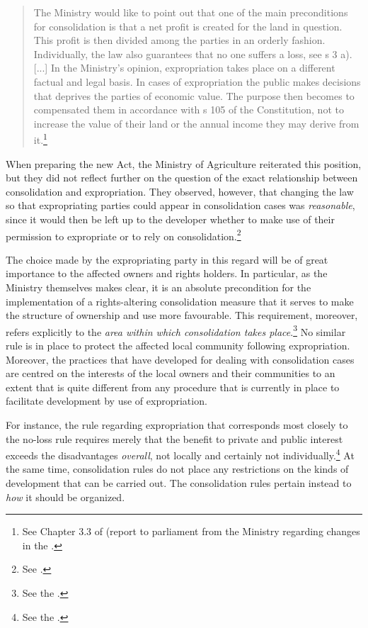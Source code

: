 \begin{quote}
The Ministry would like to point out that one of the main preconditions for consolidation is that a net profit is created for the land in question. This profit is then divided among the parties in an orderly fashion. Individually, the law also guarantees that no one suffers a loss, see s 3 a). [...] In the Ministry's opinion, expropriation takes place on a different factual and legal basis. In cases of expropriation the public makes decisions that deprives the parties of economic value. The purpose then becomes to compensated them in accordance with s 105 of the Constitution, not to increase the value of their land or the annual income they may derive from it.\footnote{See Chapter 3.3 of \cite{otprp78} (report to parliament from the Ministry regarding changes in the \cite{lca79}.}
\end{quote}

When preparing the new Act, the Ministry of Agriculture reiterated this position, but they did not reflect further on the question of the exact relationship between consolidation and expropriation. They observed, however, that changing the law so that expropriating parties could appear in consolidation cases was \emph{reasonable}, since it would then be left up to the developer whether to make use of their permission to expropriate or to rely on consolidation.\footnote{See \cite[84]{prop12}.}

The choice made by the expropriating party in this regard will be of great importance to the affected owners and rights holders. In particular, as the Ministry themselves makes clear, it is an absolute precondition for the implementation of a rights-altering consolidation measure that it serves to make the structure of ownership and use more favourable. This requirement, moreover, refers explicitly to the \emph{area within which consolidation takes place}.\footnote{See the \cite[3-3]{lca13}.} No similar rule is in place to protect the affected local community following expropriation. Moreover, the practices that have developed for dealing with consolidation cases are centred on the interests of the local owners and their communities to an extent that is quite different from any procedure that is currently in place to facilitate development by use of expropriation.

For instance, the rule regarding expropriation that corresponds most closely to the no-loss rule  
requires merely that the benefit to private and public interest exceeds the disadvantages \emph{overall}, not locally and certainly not individually.\footnote{See the \cite[2]{ea59}.} At the same time, consolidation rules do not place any restrictions on the kinds of development that can be carried out. The consolidation rules pertain instead to \emph{how} it should be organized. 

